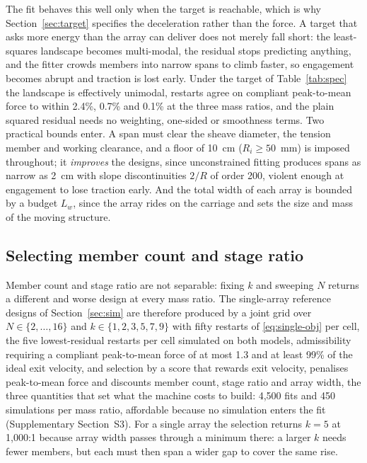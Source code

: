 \documentclass[preprint,12pt,number]{elsarticle}
\newcommand{\Lw}{L_{w}}
\newcommand{\ptm}{peak-to-mean}
\begin{document}
The fit behaves this well only when the target is reachable, which is why Section~\ref{sec:target} specifies the deceleration rather than the force. A target that asks more energy than the array can deliver does not merely fall short: the least-squares landscape becomes multi-modal, the residual stops predicting anything, and the fitter crowds members into narrow spans to climb faster, so engagement becomes abrupt and traction is lost early. Under the target of Table~\ref{tab:spec} the landscape is effectively unimodal, restarts agree on compliant \ptm{} force to within 2.4\%, 0.7\% and 0.1\% at the three mass ratios, and the plain squared residual needs no weighting, one-sided or smoothness terms. Two practical bounds enter. A span must clear the sheave diameter, the tension member and working clearance, and a floor of 10~cm ($R_i \ge 50$~mm) is imposed throughout; it \emph{improves} the designs, since unconstrained fitting produces spans as narrow as 2~cm with slope discontinuities $2/R$ of order 200, violent enough at engagement to lose traction early. And the total width of each array is bounded by a budget $\Lw$, since the array rides on the carriage and sets the size and mass of the moving structure.

\subsection{Selecting member count and stage ratio}
\label{sec:select}

Member count and stage ratio are not separable: fixing $k$ and sweeping $N$ returns a different and worse design at every mass ratio. The single-array reference designs of Section~\ref{sec:sim} are therefore produced by a joint grid over $N \in \{2,\dots,16\}$ and $k \in \{1,2,3,5,7,9\}$ with fifty restarts of \eqref{eq:single-obj} per cell, the five lowest-residual restarts per cell simulated on both models, admissibility requiring a compliant \ptm{} force of at most 1.3 and at least 99\% of the ideal exit velocity, and selection by a score that rewards exit velocity, penalises \ptm{} force and discounts member count, stage ratio and array width, the three quantities that set what the machine costs to build: 4,500 fits and 450 simulations per mass ratio, affordable because no simulation enters the fit (Supplementary Section~S3). For a single array the selection returns $k = 5$ at 1,000:1 because array width passes through a minimum there: a larger $k$ needs fewer members, but each must then span a wider gap to cover the same rise.
\end{document}
